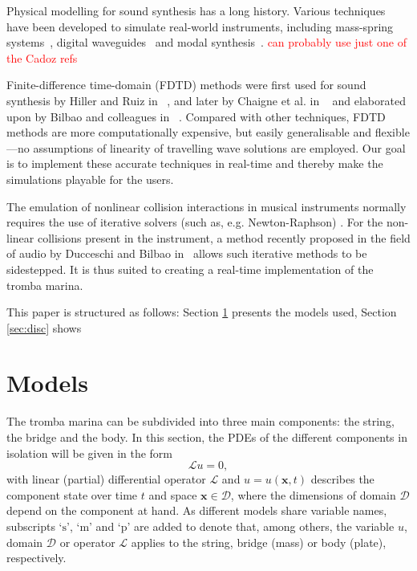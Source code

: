 \documentclass[dvipsnames, pdftex]{article}
\def\SBcomment[#1]{\textcolor{Red}{#1}}
\begin{document}
Physical modelling for sound synthesis has a long history. Various techniques have been developed to simulate real-world instruments, including mass-spring systems~\cite{cadoz79, cadoz83, cadoz1993cordis}, digital waveguides~\cite{smith1992physical} and modal synthesis~\cite{morrison1993mosaic}. 
\SBcomment[can probably use just one of the Cadoz refs]

Finite-difference time-domain (FDTD) methods were first used for sound synthesis by Hiller and Ruiz in ~\cite{Ruiz1969, Hiller1971, Hiller2}, and later by Chaigne et al. in ~\cite{Chaigne92, Chaigne} and elaborated upon by Bilbao and colleagues in ~\cite{bilbao2009numerical, Bilbao2018:Tutorial}. Compared with other techniques, FDTD methods are more computationally expensive, but easily generalisable and flexible---no assumptions of linearity of travelling wave solutions are employed. Our goal is to implement these accurate techniques in real-time and thereby make the simulations playable for the users. 

The emulation of nonlinear collision interactions in musical instruments normally requires the use of iterative solvers (such as, e.g. Newton-Raphson) \cite{Bilbao15}. For the non-linear collisions present in the instrument, a method recently proposed in the field of audio by Ducceschi and Bilbao in~\cite{Ducceschi2019} allows such iterative methods to be sidestepped. It is thus suited  to creating a real-time implementation of the tromba marina.

This paper is structured as follows: Section \ref{sec:models} presents the models used, Section \ref{sec:disc} shows 

\section{Models}\label{sec:models}
The tromba marina can be subdivided into three main components: the string, the bridge and the body. In this section, the PDEs of the different components in isolation will be given in the form
\begin{equation}\label{eq:PDEform}
    \mathcal{L}u = 0,
\end{equation}
with linear (partial) differential operator $\mathcal{L}$ and $u = u(\boldsymbol{x},t)$ describes the component state over time $t$ and space $\boldsymbol{x}\in\mathcal{D}$, where the dimensions of domain $\mathcal{D}$ depend on the component at hand. As different models share variable names, subscripts `$\text{s}$', `$\text{m}$' and `$\text{p}$' are added to denote that, among others, the variable $u$, domain ${\mathcal D}$ or operator ${\mathcal L}$ applies to the string, bridge (mass) or body (plate), respectively.
\end{document}
